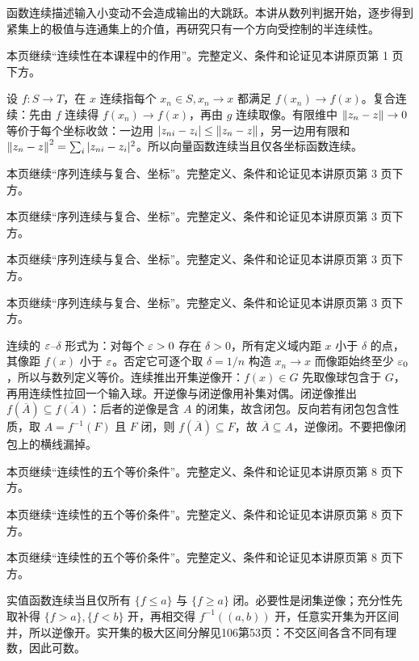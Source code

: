
函数连续描述输入小变动不会造成输出的大跳跃。本讲从数列判据开始，逐步得到紧集上的极值与连通集上的介值，再研究只有一个方向受控制的半连续性。

本页继续“连续性在本课程中的作用”。完整定义、条件和论证见本讲原页第 1 页下方。

设 $f:S\to T$，在 $x$ 连续指每个 $x_n\in S,x_n\to x$ 都满足 $f(x_n)\to f(x)$。复合连续：先由 $f$ 连续得 $f(x_n)\to f(x)$，再由 $g$ 连续取像。有限维中 $\left\lVert z_n-z\right\rVert\to0$ 等价于每个坐标收敛：一边用 $|z_{ni}-z_i|\le\left\lVert z_n-z\right\rVert$，另一边用有限和 $\left\lVert z_n-z\right\rVert^2=\sum_i|z_{ni}-z_i|^2$。所以向量函数连续当且仅各坐标函数连续。

本页继续“序列连续与复合、坐标”。完整定义、条件和论证见本讲原页第 3 页下方。

本页继续“序列连续与复合、坐标”。完整定义、条件和论证见本讲原页第 3 页下方。

本页继续“序列连续与复合、坐标”。完整定义、条件和论证见本讲原页第 3 页下方。

本页继续“序列连续与复合、坐标”。完整定义、条件和论证见本讲原页第 3 页下方。

连续的 $\varepsilon$--$\delta$ 形式为：对每个 $\varepsilon>0$ 存在 $\delta>0$，所有定义域内距 $x$ 小于 $\delta$ 的点，其像距 $f(x)$ 小于 $\varepsilon$。否定它可逐个取 $\delta=1/n$ 构造 $x_n\to x$ 而像距始终至少 $\varepsilon_0$，所以与数列定义等价。连续推出开集逆像开：$f(x)\in G$ 先取像球包含于 $G$，再用连续性拉回一个输入球。开逆像与闭逆像用补集对偶。闭逆像推出 $f(\overline A)\subseteq\overline{f(A)}$：后者的逆像是含 $A$ 的闭集，故含闭包。反向若有闭包包含性质，取 $A=f^{-1}(F)$ 且 $F$ 闭，则 $f(\overline A)\subseteq F$，故 $\overline A\subseteq A$，逆像闭。不要把像闭包上的横线漏掉。

本页继续“连续性的五个等价条件”。完整定义、条件和论证见本讲原页第 8 页下方。

本页继续“连续性的五个等价条件”。完整定义、条件和论证见本讲原页第 8 页下方。

本页继续“连续性的五个等价条件”。完整定义、条件和论证见本讲原页第 8 页下方。

实值函数连续当且仅所有 $\{f\le a\}$ 与 $\{f\ge a\}$ 闭。必要性是闭集逆像；充分性先取补得 $\{f>a\},\{f<b\}$ 开，再相交得 $f^{-1}((a,b))$ 开，任意实开集为开区间并，所以逆像开。实开集的极大区间分解见106第53页：不交区间各含不同有理数，因此可数。

